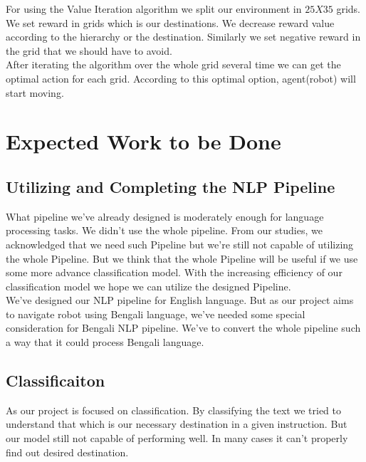 For using the Value Iteration algorithm we split our environment in $25 X 35$ grids. We set reward in grids which is our destinations. We decrease reward value according to the hierarchy or the destination. Similarly we set negative reward in the grid that we should have to avoid.\\

After iterating the algorithm over the whole grid several time we can get the optimal action for each grid. According to this optimal option, agent(robot) will start moving.\\









\section{Expected Work to be Done}

\subsection{Utilizing and Completing the NLP Pipeline}
What pipeline we've already designed is moderately enough for language processing tasks. We didn't use the whole pipeline. From our studies, we acknowledged that we need such Pipeline but we're still not capable of utilizing the whole Pipeline. But we think that the whole Pipeline will be useful if we use some more advance classification model. With the increasing efficiency of our classification model we hope we can utilize the designed Pipeline.\\

We've designed our NLP pipeline for English language. But as our project aims to navigate robot using Bengali language, we've needed some special consideration for Bengali NLP pipeline. We've to convert the whole pipeline such a way that it could process Bengali language.\\


\subsection{Classificaiton}
As our project is focused on classification. By classifying the text we tried to understand that which is our necessary destination in a given instruction. But our model still not capable of performing well. In many cases it can't properly find out desired destination.\\

